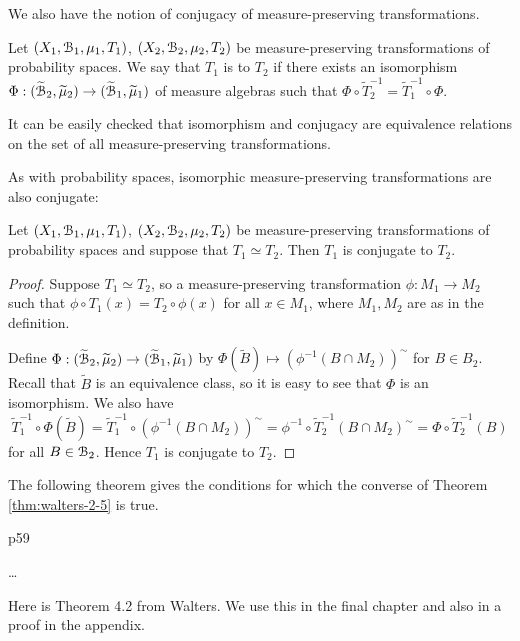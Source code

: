 We also have the notion of conjugacy of measure-preserving transformations.

\begin{definition}
	Let $(X_1, \mathcal{B}_1, \mu_1, T_1)$, $(X_2, \mathcal{B}_2, \mu_2, T_2)$ be measure-preserving transformations of probability spaces. We say that $T_1$ is  to $T_2$ if there exists an isomorphism $\Phi : (\widetilde{\mathcal{B}}_2, \widetilde{\mu}_2) \to (\widetilde{\mathcal{B}}_1, \widetilde{\mu}_1)$ of measure algebras such that $\Phi \circ \tilde{T}_2^{-1} = \tilde{T}_1^{-1} \circ \Phi$.
\end{definition}

It can be easily checked that isomorphism and conjugacy are equivalence relations on the set of all measure-preserving transformations.

As with probability spaces, isomorphic measure-preserving transformations are also conjugate:

\begin{theorem}\label{thm:walters-2-5}
	Let $(X_1, \mathcal{B}_1, \mu_1, T_1)$, $(X_2, \mathcal{B}_2, \mu_2, T_2)$ be measure-preserving transformations of probability spaces and suppose that $T_1 \simeq T_2$. Then $T_1$ is conjugate to $T_2$.
	\begin{proof}
		Suppose $T_1 \simeq T_2$, so a measure-preserving transformation $\phi : M_1 \to M_2$ such that $\phi \circ T_1(x) = T_2 \circ \phi(x)$ for all $x \in M_1$, where $M_1, M_2$ are as in the definition.
		
		Define $\Phi : (\widetilde{\mathcal{B}}_2, \widetilde{\mu}_2) \to (\widetilde{\mathcal{B}}_1, \widetilde{\mu}_1)$ by $\Phi(\tilde{B}) \mapsto (\phi^{-1}(B \cap M_2))^\sim$ for $B \in B_2$. Recall that $\tilde{B}$ is an equivalence class, so it is easy to see that $\Phi$ is an isomorphism. We also have
		\[
			\tilde{T}_1^{-1} \circ \Phi(\tilde{B}) = \tilde{T}_1^{-1} \circ (\phi^{-1}(B \cap M_2))^\sim = \phi^{-1} \circ \tilde{T}_2^{-1} (B \cap M_2)^\sim = \Phi \circ \tilde{T}_2^{-1}(B)
		\]
		for all $B \in \mathcal{B}_2$. Hence $T_1$ is conjugate to $T_2$.
	\end{proof}
\end{theorem}

The following theorem gives the conditions for which the converse of Theorem \ref{thm:walters-2-5} is true.

\begin{theorem}
	p59
\end{theorem}

\dots

Here is Theorem 4.2 from Walters. We use this in the final chapter and also in a proof in the appendix.

